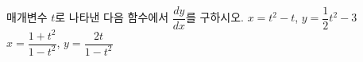 매개변수 $t$로 나타낸 다음 함수에서 $\dfrac{dy}{dx}$를 구하시오.
 $x=t^2-t$, $y=\dfrac{1}{2}t^2-3$
 $x=\dfrac{1+t^2}{1-t^2}$, $y=\dfrac{2t}{1-t^2}$
